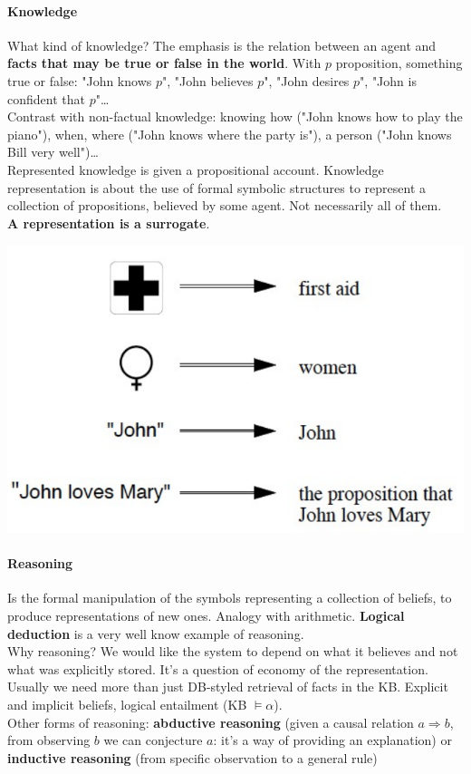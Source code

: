 \documentclass[10pt]{report}
\begin{document}
\paragraph{Knowledge} What kind of knowledge? The emphasis is the relation between an agent and \textbf{facts that may be true or false in the world}. With $p$ proposition, something true or false: "John knows $p$", "John believes $p$", "John desires $p$", "John is confident that $p$"\ldots\\
Contrast with non-factual knowledge: knowing how ("John knows how to play the piano"), when, where ("John knows where the party is"), a person ("John knows Bill very well")\ldots\\
Represented knowledge is given a propositional account. Knowledge representation is about the use of formal symbolic structures to represent a collection of propositions, believed by some agent. Not necessarily all of them.\\
\textbf{A representation is a surrogate}.
\begin{center}
	\includegraphics[scale=0.5]{11.png}
\end{center}
\paragraph{Reasoning} Is the formal manipulation of the symbols representing a collection of beliefs, to produce representations of new ones. Analogy with arithmetic. \textbf{Logical deduction} is a very well know example of reasoning.\\
Why reasoning? We would like the system to depend on what it believes and not what was explicitly stored. It's a question of economy of the representation.\\
Usually we need more than just DB-styled retrieval of facts in the KB. Explicit and implicit beliefs, logical entailment (KB $\vDash \alpha$).\\
Other forms of reasoning: \textbf{abductive reasoning} (given a causal relation $a\Rightarrow b$, from observing $b$ we can conjecture $a$: it's a way of providing an explanation) or \textbf{inductive reasoning} (from specific observation to a general rule)
\end{document}

